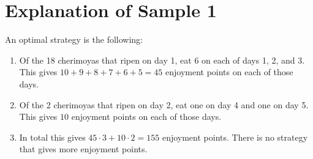 \section*{Explanation of Sample 1}
An optimal strategy is the following:
\begin{enumerate}
    \item Of the 18 cherimoyas that ripen on day 1, eat 6 on each of days 1, 2, and 3.
    This gives $10+9+8+7+6+5=45$ enjoyment points on each of those days.
    \item Of the 2 cherimoyas that ripen on day 2, eat one on day 4 and one on day 5.
    This gives $10$ enjoyment points on each of those days.
    \item In total this gives $45 \cdot 3+10 \cdot 2=155$ enjoyment points. There is no strategy
    that gives more enjoyment points.
\end{enumerate}
